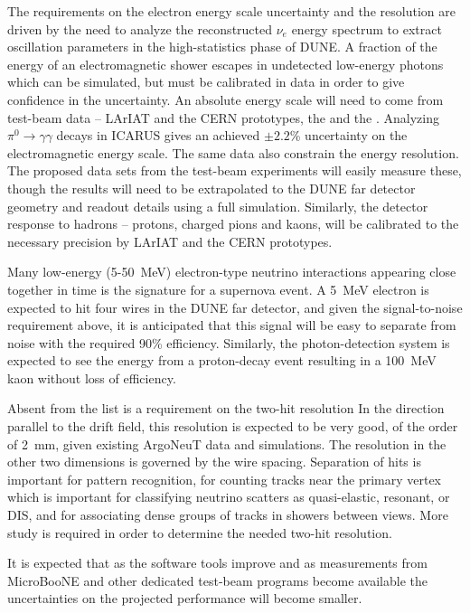 The requirements on the electron energy scale uncertainty and the
resolution are driven by the need to analyze the reconstructed $\nu_e$
energy spectrum to extract oscillation parameters in the
high-statistics phase of DUNE.  A fraction of the energy of an
electromagnetic shower escapes in undetected low-energy photons which
can be simulated, but must be calibrated in data in order to give
confidence in the uncertainty.  An absolute energy scale will need to
come from test-beam data -- LArIAT and the CERN prototypes, the
\cernsingleproto{} and the \cerndualproto.  Analyzing
$\pi^0\rightarrow\gamma\gamma$ decays in ICARUS\cite{ICARUS-pizero}
gives an achieved $\pm 2.2$\% uncertainty on the electromagnetic
energy scale.  The same data also constrain the energy resolution.
The proposed data sets from the test-beam experiments will easily
measure these, though the results will need to be extrapolated to the
DUNE far detector geometry and readout details using a full
simulation.  Similarly, the detector response to hadrons -- protons,
charged pions and kaons, will be calibrated to the necessary precision
by LArIAT and the CERN prototypes.

Many low-energy (5-50~MeV) electron-type neutrino interactions
appearing close together in time is the signature for a supernova
event.  A 5~MeV electron is expected to hit four wires in the DUNE far
detector, and given the signal-to-noise requirement above, it is
anticipated that this signal will be easy to separate from noise with
the required 90\% efficiency.  Similarly, the photon-detection system
is expected to see the energy from a proton-decay event resulting in a
100~MeV kaon without loss of efficiency.

Absent from the list is a requirement on the two-hit resolution In the
direction parallel to the drift field, this resolution is expected to
be very good, of the order of 2~mm, given existing ArgoNeuT data and
simulations.  The resolution in the other two dimensions is governed
by the wire spacing.  Separation of hits is important for pattern
recognition, for counting tracks near the primary vertex which is
important for classifying neutrino scatters as quasi-elastic,
resonant, or DIS, and for associating dense groups of tracks in
showers between views.  More study is required in order to determine
the needed two-hit resolution.

It is expected that as the software tools improve and as measurements
from MicroBooNE and other dedicated test-beam programs become
available the uncertainties on the projected performance will become
smaller.
